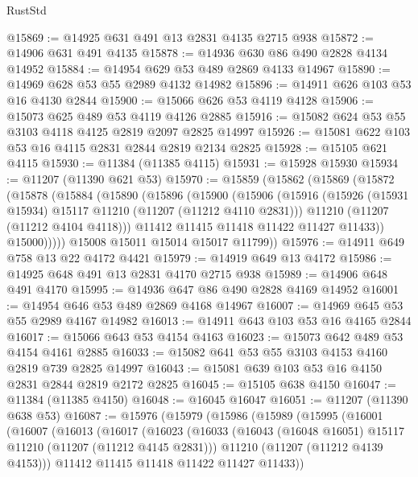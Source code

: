 \begin{lexlean}{RustStd}
\begin{coremodule}
@15869 := @14925 @631 @491 @13 @2831 @4135 @2715 @938
@15872 := @14906 @631 @491 @4135
@15878 := @14936 @630 @86 @490 @2828 @4134 @14952
@15884 := @14954 @629 @53 @489 @2869 @4133 @14967
@15890 := @14969 @628 @53 @55 @2989 @4132 @14982
@15896 := @14911 @626 @103 @53 @16 @4130 @2844
@15900 := @15066 @626 @53 @4119 @4128
@15906 := @15073 @625 @489 @53 @4119 @4126 @2885
@15916 := @15082 @624 @53 @55 @3103 @4118 @4125 @2819 @2097 @2825 @14997
@15926 := @15081 @622 @103 @53 @16 @4115 @2831 @2844 @2819 @2134 @2825
@15928 := @15105 @621 @4115
@15930 := @11384 (@11385 @4115)
@15931 := @15928 @15930
@15934 := @11207 (@11390 @621 @53)
@15970 := @15859
    (@15862
      (@15869
        (@15872
          (@15878
            (@15884
              (@15890
                (@15896
                  (@15900
                    (@15906
                      (@15916
                        (@15926 (@15931 @15934) @15117 @11210 (@11207 (@11212 @4110 @2831)))
                        @11210
                        (@11207 (@11212 @4104 @4118)))
                      @11412
                      @11415
                      @11418
                      @11422
                      @11427
                      @11433))
                  @15000)))))
        @15008
        @15011
        @15014
        @15017
        @11799))
@15976 := @14911 @649 @758 @13 @22 @4172 @4421
@15979 := @14919 @649 @13 @4172
@15986 := @14925 @648 @491 @13 @2831 @4170 @2715 @938
@15989 := @14906 @648 @491 @4170
@15995 := @14936 @647 @86 @490 @2828 @4169 @14952
@16001 := @14954 @646 @53 @489 @2869 @4168 @14967
@16007 := @14969 @645 @53 @55 @2989 @4167 @14982
@16013 := @14911 @643 @103 @53 @16 @4165 @2844
@16017 := @15066 @643 @53 @4154 @4163
@16023 := @15073 @642 @489 @53 @4154 @4161 @2885
@16033 := @15082 @641 @53 @55 @3103 @4153 @4160 @2819 @739 @2825 @14997
@16043 := @15081 @639 @103 @53 @16 @4150 @2831 @2844 @2819 @2172 @2825
@16045 := @15105 @638 @4150
@16047 := @11384 (@11385 @4150)
@16048 := @16045 @16047
@16051 := @11207 (@11390 @638 @53)
@16087 := @15976
    (@15979
      (@15986
        (@15989
          (@15995
            (@16001
              (@16007
                (@16013
                  (@16017
                    (@16023
                      (@16033
                        (@16043 (@16048 @16051) @15117 @11210 (@11207 (@11212 @4145 @2831)))
                        @11210
                        (@11207 (@11212 @4139 @4153)))
                      @11412
                      @11415
                      @11418
                      @11422
                      @11427
                      @11433))

\end{coremodule}
\end{lexlean}

